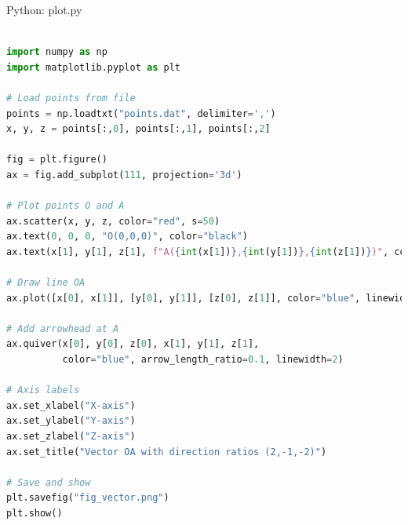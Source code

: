 \documentclass{beamer}
\numberwithin{equation}{section}
\theoremstyle{remark}
\begin{document}
\begin{frame}[fragile]{Python: plot.py}
\begin{lstlisting}[language=Python]

import numpy as np
import matplotlib.pyplot as plt

# Load points from file
points = np.loadtxt("points.dat", delimiter=',')
x, y, z = points[:,0], points[:,1], points[:,2]

fig = plt.figure()
ax = fig.add_subplot(111, projection='3d')

# Plot points O and A
ax.scatter(x, y, z, color="red", s=50)  
ax.text(0, 0, 0, "O(0,0,0)", color="black")
ax.text(x[1], y[1], z[1], f"A({int(x[1])},{int(y[1])},{int(z[1])})", color="blue")

# Draw line OA
ax.plot([x[0], x[1]], [y[0], y[1]], [z[0], z[1]], color="blue", linewidth=2)

# Add arrowhead at A
ax.quiver(x[0], y[0], z[0], x[1], y[1], z[1],
          color="blue", arrow_length_ratio=0.1, linewidth=2)

# Axis labels
ax.set_xlabel("X-axis")
ax.set_ylabel("Y-axis")
ax.set_zlabel("Z-axis")
ax.set_title("Vector OA with direction ratios (2,-1,-2)")

# Save and show
plt.savefig("fig_vector.png")
plt.show()

\end{lstlisting}
\end{frame}
\end{document}
